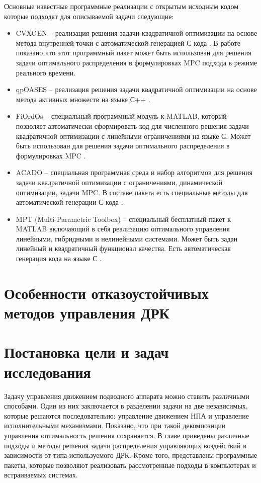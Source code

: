 Основные известные программные реализации с открытым исходным кодом которые подходят для описываемой задачи следующие:
\begin{itemize}
    \item CVXGEN -- реализация решения задачи квадратичной оптимизации на основе метода внутренней точки с автоматической генерацией С кода \cite{mattingley2010real}. В работе \cite{10.1109/icca.2011.6137940} показано что этот программный пакет может быть использован для решения задачи оптимального распределения в формулировках MPC подхода в режиме реального времени.
    \item qpOASES -- реализация решения задачи квадратичной оптимизации на основе метода активных множеств на языке С++ \cite{ferreau2014qpoases}.
    \item FiOrdOs -- специальный программный модуль к MATLAB, который позволяет автоматически сформировать код для численного решения задачи квадратичной оптимизации с линейными ограничениями на языке С. Может быть использован для решения задачи оптимального распределения в формулировках MPC \cite{jones2012fast}.
    \item ACADO -- специальная программная среда и набор алгоритмов для решения задачи квадратичной оптимизации с ограничениями, динамической оптимизации, задачи MPC. В составе пакета есть специальные методы для автоматической генерации С кода \cite{houska2011acado}.
    \item MPT (Multi-Parametric Toolbox) -- специальный бесплатный пакет к MATLAB включающий в себя реализацию оптимального управления линейными, гибридными и нелинейными системами. Может быть задан линейный и квадратичный функционал качества. Есть автоматическая генерация кода на языке С \cite{kvasnica2004multi}.
\end{itemize}

\section{Особенности отказоустойчивых методов управления ДРК}\label{sec:Propulsion/FaultToulerant}

\section{Постановка цели и задач исследования}\label{sec:Statement/SetProblems}

Задачу управления движением подводного аппарата можно ставить различными способами.
Один из них заключается в разделении задачи на две независимых, которые решаются последовательно: управление движением НПА и управление исполнительными механизмами.
Показано, что при такой декомпозиции управления оптимальность решения сохраняется.
В главе приведены различные подходы и методы решения задачи распределения управляющих воздействий в зависимости от типа используемого ДРК.
Кроме того, представлены программные пакеты, которые позволяют реализовать рассмотренные подходы в компьютерах и встраиваемых системах. 

